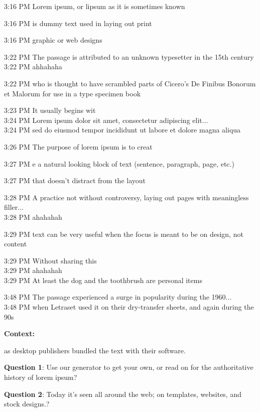\documentclass[11pt]{extarticle}
\def\namesc{{image4.png},{image5.png}}
\begin{document}
\begin{chat}
3:16 PM Lorem ipsum, or lipsum as it is sometimes known

3:16 PM is dummy text used in laying out print

3:16 PM graphic or web designs

3:22 PM The passage is attributed to an unknown typesetter in the 15th century\\
3:22 PM ahhahaha

3:22 PM who is thought to have scrambled parts of Cicero's De Finibus Bonorum et Malorum for use in a type specimen book

3:23 PM It usually begins wit\\
3:24 PM Lorem ipsum dolor sit amet, consectetur adipiscing elit...\\
3:24 PM sed do eiusmod tempor incididunt ut labore et dolore magna aliqua

3:26 PM The purpose of lorem ipsum is to creat

3:27 PM e a natural looking block of text (sentence, paragraph, page, etc.)

3:27 PM that doesn't distract from the layout

3:28 PM A practice not without controversy, laying out pages with meaningless filler...\\
3:28 PM ahahahah

3:29 PM text can be very useful when the focus is meant to be on design, not content

3:29 PM Without sharing this \\
3:29 PM ahahahah\\
3:29 PM At least the dog and the toothbrush are personal items

3:48 PM The passage experienced a surge in popularity during the 1960...\\
3:48 PM when Letraset used it on their dry-transfer sheets, and again during the 90s



\end{chat}

\vspace{0.5in}

\textbf{Context:}

as desktop publishers bundled the text with their software.



\textbf{Question 1}: Use our generator to get your own, or read on for the authoritative history of lorem ipsum?



\textbf{Question 2}: Today it's seen all around the web; on templates, websites, and stock designs.?

%
%
%
%
\end{document}
